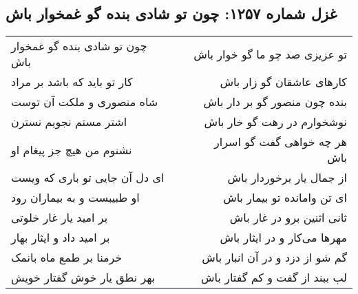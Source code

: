 \begin{center}
\section*{غزل شماره ۱۲۵۷: چون تو شادی بنده گو غمخوار باش}
\label{sec:1257}
\begin{longtable}{l p{0.5cm} r}
چون تو شادی بنده گو غمخوار باش
&&
تو عزیزی صد چو ما گو خوار باش
\\
کار تو باید که باشد بر مراد
&&
کارهای عاشقان گو زار باش
\\
شاه منصوری و ملکت آن توست
&&
بنده چون منصور گو بر دار باش
\\
اشتر مستم نجویم نسترن
&&
نوشخوارم در رهت گو خار باش
\\
نشنوم من هیچ جز پیغام او
&&
هر چه خواهی گفت گو اسرار باش
\\
ای دل آن جایی تو باری که ویست
&&
از جمال یار برخوردار باش
\\
او طبیبست و به بیماران رود
&&
ای تن وامانده تو بیمار باش
\\
بر امید یار غار خلوتی
&&
ثانی اثنین برو در غار باش
\\
بر امید داد و ایثار بهار
&&
مهرها می‌کار و در ایثار باش
\\
خرمنا بر طمع ماه بانمک
&&
گم شو از دزد و در آن انبار باش
\\
بهر نطق یار خوش گفتار خویش
&&
لب ببند از گفت و کم گفتار باش
\\
\end{longtable}
\end{center}
